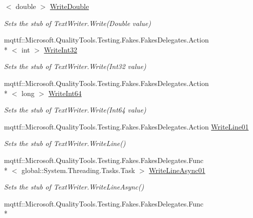 \begin{DoxyCompactItemize}
$<$ double $>$ \hyperlink{class_system_1_1_i_o_1_1_fakes_1_1_stub_string_writer_a9d1b513a1d88b8f007372762f7719560}{Write\-Double}
\begin{DoxyCompactList}\small\item\em Sets the stub of Text\-Writer.\-Write(\-Double value)\end{DoxyCompactList}\item 
mqttf\-::\-Microsoft.\-Quality\-Tools.\-Testing.\-Fakes.\-Fakes\-Delegates.\-Action\\*
$<$ int $>$ \hyperlink{class_system_1_1_i_o_1_1_fakes_1_1_stub_string_writer_ac76b88364a4f21259c041c696ff246d4}{Write\-Int32}
\begin{DoxyCompactList}\small\item\em Sets the stub of Text\-Writer.\-Write(\-Int32 value)\end{DoxyCompactList}\item 
mqttf\-::\-Microsoft.\-Quality\-Tools.\-Testing.\-Fakes.\-Fakes\-Delegates.\-Action\\*
$<$ long $>$ \hyperlink{class_system_1_1_i_o_1_1_fakes_1_1_stub_string_writer_a070f2de3d8c948fef7edd78906c6fc0c}{Write\-Int64}
\begin{DoxyCompactList}\small\item\em Sets the stub of Text\-Writer.\-Write(\-Int64 value)\end{DoxyCompactList}\item 
mqttf\-::\-Microsoft.\-Quality\-Tools.\-Testing.\-Fakes.\-Fakes\-Delegates.\-Action \hyperlink{class_system_1_1_i_o_1_1_fakes_1_1_stub_string_writer_a198abc00c341d34e69a98ca06504870d}{Write\-Line01}
\begin{DoxyCompactList}\small\item\em Sets the stub of Text\-Writer.\-Write\-Line()\end{DoxyCompactList}\item 
mqttf\-::\-Microsoft.\-Quality\-Tools.\-Testing.\-Fakes.\-Fakes\-Delegates.\-Func\\*
$<$ global\-::\-System.\-Threading.\-Tasks.\-Task $>$ \hyperlink{class_system_1_1_i_o_1_1_fakes_1_1_stub_string_writer_acae04b559c4e4aa77fe04ce4102bce86}{Write\-Line\-Async01}
\begin{DoxyCompactList}\small\item\em Sets the stub of Text\-Writer.\-Write\-Line\-Async()\end{DoxyCompactList}\item 
mqttf\-::\-Microsoft.\-Quality\-Tools.\-Testing.\-Fakes.\-Fakes\-Delegates.\-Func\\*

\end{DoxyCompactItemize}
